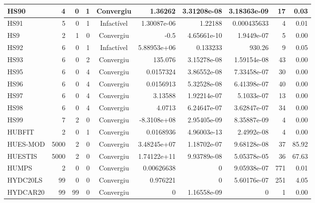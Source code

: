 \begin{center}
\begin{longtable}{|l|r|r|r|c|r|r|r|r|r|}
    HS90 &      4 &      0 &      1 & Convergiu  &     1.36262 &    3.31208e-08 & 3.18363e-09 &     17 &    0.03 \\ \hline
    HS91 &      5 &      0 &      1 & Infactível & 1.30087e-06 &        1.22188 & 0.000435633 &      4 &    0.01 \\ \hline
     HS9 &      2 &      1 &      0 & Convergiu  &        -0.5 &    4.65661e-10 &  1.9449e-07 &      5 &    0.00 \\ \hline
    HS92 &      6 &      0 &      1 & Infactível & 5.88953e+06 &       0.133233 &      930.26 &      9 &    0.05 \\ \hline
    HS93 &      6 &      0 &      2 & Convergiu  &     135.076 &    3.15278e-08 & 1.59154e-08 &     43 &    0.00 \\ \hline
    HS95 &      6 &      0 &      4 & Convergiu  &   0.0157324 &    3.86552e-08 & 7.33458e-07 &     30 &    0.00 \\ \hline
    HS96 &      6 &      0 &      4 & Convergiu  &   0.0156913 &    5.32528e-08 & 6.41398e-07 &     40 &    0.00 \\ \hline
    HS97 &      6 &      0 &      4 & Convergiu  &     3.13588 &    1.92214e-07 &  5.1033e-07 &     13 &    0.00 \\ \hline
    HS98 &      6 &      0 &      4 & Convergiu  &      4.0713 &    6.24647e-07 & 3.62847e-07 &     34 &    0.00 \\ \hline
    HS99 &      7 &      2 &      0 & Convergiu  & -8.3108e+08 &    2.95405e-09 & 8.35887e-09 &      4 &    0.00 \\ \hline
  HUBFIT &      2 &      0 &      1 & Convergiu  &   0.0168936 &    4.96003e-13 &  2.4992e-08 &      4 &    0.00 \\ \hline
HUES-MOD &   5000 &      2 &      0 & Convergiu  & 3.48245e+07 &    1.18702e-07 & 9.68128e-08 &     37 &   85.92 \\ \hline
 HUESTIS &   5000 &      2 &      0 & Convergiu  & 1.74122e+11 &    9.93789e-08 & 5.05378e-05 &     36 &   67.63 \\ \hline
   HUMPS &      2 &      0 &      0 & Convergiu  &  0.00626638 &              0 & 9.05938e-07 &    771 &    0.01 \\ \hline
HYDC20LS &     99 &      0 &      0 & Convergiu  &    0.976221 &              0 & 5.60176e-07 &    251 &    4.05 \\ \hline
HYDCAR20 &     99 &     99 &      0 & Convergiu  &           0 &    1.16558e-09 &           0 &      1 &    0.00 \\ \hline

\end{longtable}
\end{center}
